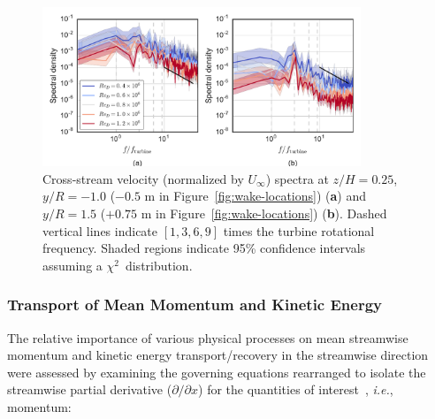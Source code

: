 \documentclass[energies,article,accept,moreauthors,pdftex,10pt,a4paper]{mdpi}
\theoremstyle{mdpi}
\newcounter{ex}
\newcounter{re}
\begin{document}
\begin{figure}[H]
\centering

\includegraphics[width=0.85\textwidth]{figures/wake_spectra}

\caption{Cross-stream velocity (normalized by $U_\infty$) spectra at $z/H=0.25$,
 $y/R=-1.0$ ($-0.5$ m in Figure~\ref{fig:wake-locations}) (\textbf{a}) and $y/R=1.5$
 ($+0.75$ m in Figure~\ref{fig:wake-locations}) (\textbf{b}). Dashed vertical lines
 indicate $[1, 3, 6, 9]$ times the turbine rotational frequency. Shaded regions
 indicate 95\% confidence intervals assuming a $\chi^2$~distribution.}

\label{fig:wake-spectra}
\end{figure}



\subsubsection{Transport of Mean Momentum and Kinetic Energy}

The relative importance of various physical processes on mean streamwise
momentum and kinetic energy transport/recovery in the streamwise direction were
assessed by examining the governing equations rearranged to isolate the
streamwise partial derivative ($\partial / \partial x$) for the quantities of
interest~\cite{Bachant2015-JoT}, \emph{i.e.}, momentum:
\end{document}
